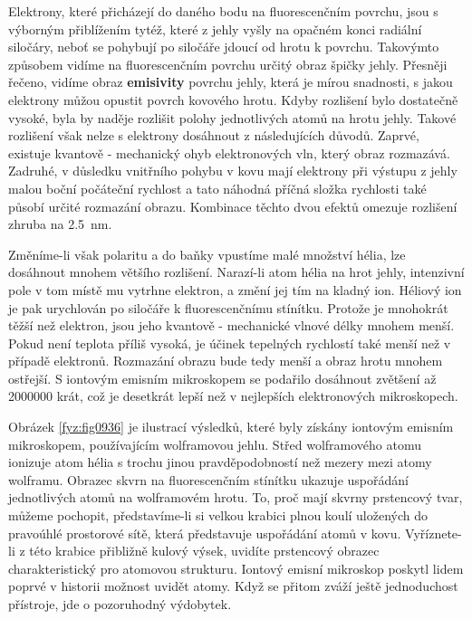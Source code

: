   Elektrony, které přicházejí do daného bodu na fluorescenčním povrchu, jsou s výborným přiblížením
  tytéž, které z jehly vyšly na opačném konci radiální siločáry, neboť se pohybují po siločáře
  jdoucí od hrotu k povrchu. Takovýmto způsobem vidíme na fluorescenčním povrchu určitý obraz špičky
  jehly. Přesněji řečeno, vidíme obraz \textbf{emisivity} povrchu jehly, která je mírou snadnosti, s
  jakou elektrony můžou opustit povrch kovového hrotu. Kdyby rozlišení bylo dostatečně vysoké, byla
  by naděje rozlišit polohy jednotlivých atomů na hrotu jehly. Takové rozlišení však nelze s
  elektrony dosáhnout z následujících důvodů. Zaprvé, existuje kvantově - mechanický ohyb
  elektronových vln, který obraz rozmazává. Zadruhé, v důsledku vnitřního pohybu v kovu mají
  elektrony při výstupu z jehly malou boční počáteční rychlost a tato náhodná příčná složka
  rychlosti také působí určité rozmazání obrazu. Kombinace těchto dvou efektů omezuje rozlišení
  zhruba na \SI{2.5}{\nm}.

  Změníme-li však polaritu a do baňky vpustíme malé množství hélia, lze dosáhnout mnohem většího
  rozlišení. Narazí-li atom hélia na hrot jehly, intenzivní pole v tom místě mu vytrhne elektron, a
  změní jej tím na kladný ion. Héliový ion je pak urychlován po siločáře k fluorescenčnímu stínítku.
  Protože je mnohokrát těžší než elektron, jsou jeho kvantově - mechanické vlnové délky mnohem
  menší. Pokud není teplota příliš vysoká, je účinek tepelných rychlostí také menší než v případě
  elektronů. Rozmazání obrazu bude tedy menší a obraz hrotu mnohem ostřejší. S iontovým emisním
  mikroskopem se podařilo dosáhnout zvětšení až \num{2000000} krát, což je desetkrát lepší než v
  nejlepších elektronových mikroskopech.

  Obrázek \ref{fyz:fig0936} je ilustrací výsledků, které byly získány iontovým emisním mikroskopem,
  používajícím wolframovou jehlu. Střed wolframového atomu ionizuje atom hélia s trochu jinou
  pravděpodobností než mezery mezi atomy wolframu. Obrazec skvrn na fluorescenčním stínítku ukazuje
  uspořádání jednotlivých atomů na wolframovém hrotu. To, proč mají skvrny prstencový tvar, můžeme
  pochopit, představíme-li si velkou krabici plnou koulí uložených do pravoúhlé prostorové sítě,
  která představuje uspořádání atomů v kovu. Vyříznete-li z této krabice přibližně kulový výsek,
  uvidíte prstencový obrazec charakteristický pro atomovou strukturu. Iontový emisní mikroskop
  poskytl lidem poprvé v historii možnost uvidět atomy. Když se přitom zváží ještě jednoduchost
  přístroje, jde o pozoruhodný výdobytek.
  
